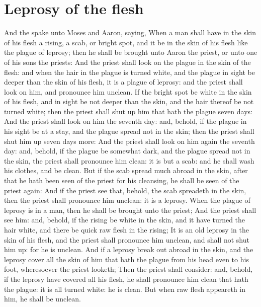 \section*{Leprosy of the flesh}
\begin{biblechapter} %
\verse And the \LORD spake unto Moses and Aaron, saying,
\verse When a man shall have in the skin of his flesh a rising, a scab, or bright spot, and it be in the skin of his flesh like the plague of leprosy; then he shall be brought unto Aaron the priest, or unto one of his sons the priests:
\verse And the priest shall look on the plague in the skin of the flesh: and when the hair in the plague is turned white, and the plague in sight be deeper than the skin of his flesh, it is a plague of leprosy: and the priest shall look on him, and pronounce him unclean.
\verse If the bright spot be white in the skin of his flesh, and in sight be not deeper than the skin, and the hair thereof be not turned white; then the priest shall shut up him that hath the plague seven days:
\verse And the priest shall look on him the seventh day: and, behold, if the plague in his sight be at a stay, and the plague spread not in the skin; then the priest shall shut him up seven days more:
\verse And the priest shall look on him again the seventh day: and, behold, if the plague be somewhat dark, and the plague spread not in the skin, the priest shall pronounce him clean: it is but a scab: and he shall wash his clothes, and be clean.
\verse But if the scab spread much abroad in the skin, after that he hath been seen of the priest for his cleansing, he shall be seen of the priest again:
\verse And if the priest see that, behold, the scab spreadeth in the skin, then the priest shall pronounce him unclean: it is a leprosy.
\verse When the plague of leprosy is in a man, then he shall be brought unto the priest;
\verse And the priest shall see him: and, behold, if the rising be white in the skin, and it have turned the hair white, and there be quick raw flesh in the rising;
\verse It is an old leprosy in the skin of his flesh, and the priest shall pronounce him unclean, and shall not shut him up: for he is unclean.
\verse And if a leprosy break out abroad in the skin, and the leprosy cover all the skin of him that hath the plague from his head even to his foot, wheresoever the priest looketh;
\verse Then the priest shall consider: and, behold, if the leprosy have covered all his flesh, he shall pronounce him clean that hath the plague: it is all turned white: he is clean.
\verse But when raw flesh appeareth in him, he shall be unclean.

\end{biblechapter}

